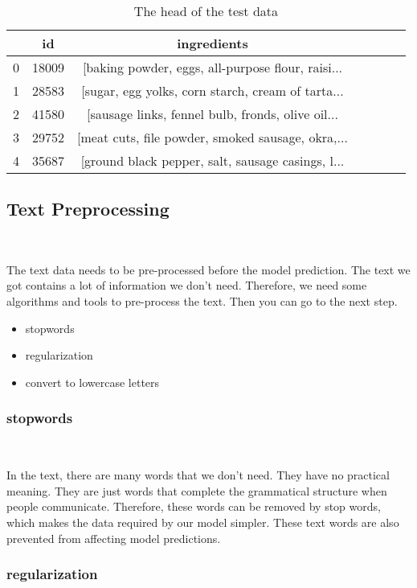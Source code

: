 \begin{table}[htbp]  \centering
    \caption{The head of the test data}
    \label{tbl:data information}
    \begin{tabular}{ccccccc}
      & id & ingredients\\
      \hline
      0  & 18009 & [baking powder, eggs, all-purpose flour, raisi... \\
      1  & 28583 & [sugar, egg yolks, corn starch, cream of tarta... \\
      2  & 41580 & [sausage links, fennel bulb, fronds, olive oil... \\
      3  & 29752 & [meat cuts, file powder, smoked sausage, okra,... \\
      4  & 35687 & [ground black pepper, salt, sausage casings, l... \\
      \hline 
    \end{tabular}
  \end{table}

\subsection{Text Preprocessing}
\

The text data needs to be pre-processed before the model prediction.
The text we got contains a lot of information we don't need. Therefore,
we need some algorithms and tools to pre-process the text. Then you can go to the next step.

\begin{itemize}
	\item stopwords
	\item regularization
	\item convert to lowercase letters
  \end{itemize}
\subsubsection{stopwords}
\

In the text, there are many words that we don't need. They have no practical meaning. 
They are just words that complete the grammatical structure when people communicate. 
Therefore, these words can be removed by stop words, which makes the data required by 
our model simpler. These text words are also prevented from affecting model predictions.

\subsubsection{regularization}
\

